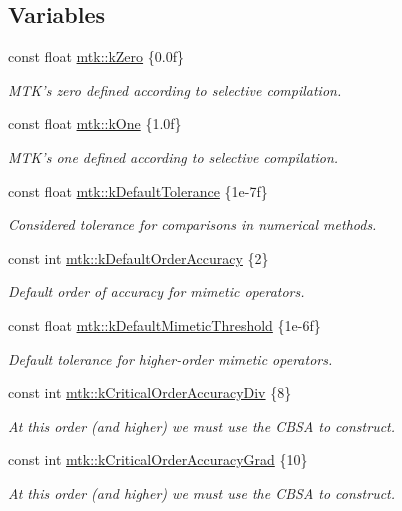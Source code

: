 \subsection*{Variables}
\begin{DoxyCompactItemize}
\item 
const float \hyperlink{group__c01-roots_ga59a451a5fae30d59649bcda274fea271}{mtk\-::k\-Zero} \{0.\-0f\}
\begin{DoxyCompactList}\small\item\em M\-T\-K's zero defined according to selective compilation. \end{DoxyCompactList}\item 
const float \hyperlink{group__c01-roots_ga26407c24d43b6b95480943340d285c71}{mtk\-::k\-One} \{1.\-0f\}
\begin{DoxyCompactList}\small\item\em M\-T\-K's one defined according to selective compilation. \end{DoxyCompactList}\item 
const float \hyperlink{group__c01-roots_gae914b125d81d1b97e0aee7bbc7739786}{mtk\-::k\-Default\-Tolerance} \{1e-\/7f\}
\begin{DoxyCompactList}\small\item\em Considered tolerance for comparisons in numerical methods. \end{DoxyCompactList}\item 
const int \hyperlink{group__c01-roots_ga0d95560098eb36420511103637b6952f}{mtk\-::k\-Default\-Order\-Accuracy} \{2\}
\begin{DoxyCompactList}\small\item\em Default order of accuracy for mimetic operators. \end{DoxyCompactList}\item 
const float \hyperlink{group__c01-roots_ga35718d949bdc81a08a9cc8ebbe3478a2}{mtk\-::k\-Default\-Mimetic\-Threshold} \{1e-\/6f\}
\begin{DoxyCompactList}\small\item\em Default tolerance for higher-\/order mimetic operators. \end{DoxyCompactList}\item 
const int \hyperlink{group__c01-roots_ga0898eef2108473e44a5223932d571c31}{mtk\-::k\-Critical\-Order\-Accuracy\-Div} \{8\}
\begin{DoxyCompactList}\small\item\em At this order (and higher) we must use the C\-B\-S\-A to construct. \end{DoxyCompactList}\item 
const int \hyperlink{group__c01-roots_ga295dd2f403c775ecd942c22b5a777496}{mtk\-::k\-Critical\-Order\-Accuracy\-Grad} \{10\}
\begin{DoxyCompactList}\small\item\em At this order (and higher) we must use the C\-B\-S\-A to construct. \end{DoxyCompactList}\end{DoxyCompactItemize}



